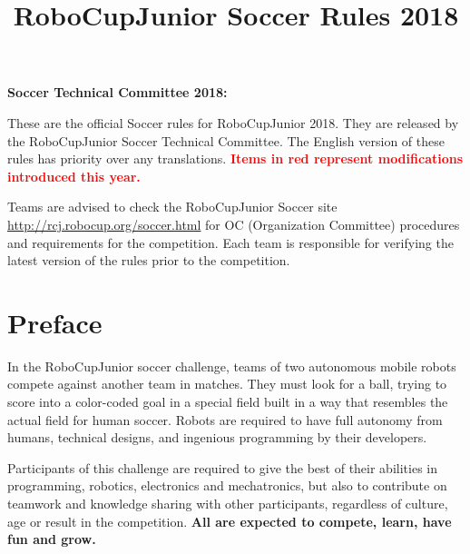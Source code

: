 \documentclass{article}
\title{\vspace{-5ex}RoboCupJunior Soccer Rules 2018\vspace{-5ex}}
\date{\vspace{-2ex}}
\begin{document}
\maketitle
\thispagestyle{firststyle}

\textbf{Soccer Technical Committee 2018:}


These are the official Soccer rules for RoboCupJunior 2018. They are released
by the RoboCupJunior Soccer Technical Committee. The English version of these
rules has priority over any translations. \textcolor{red}{\textbf{Items in red
represent modifications introduced this year.}}

Teams are advised to check the RoboCupJunior Soccer site
\href{http://rcj.robocup.org/soccer.html}{http://rcj.robocup.org/soccer.html}
for OC (Organization Committee) procedures and requirements for the
competition. Each team is responsible for verifying the latest version of the
rules prior to the competition.

\section*{Preface}

In the RoboCupJunior soccer challenge, teams of two autonomous mobile robots
compete against another team in matches. They must look for a ball, trying to
score into a color-coded goal in a special field built in a way that resembles
the actual field for human soccer. Robots are required to have full autonomy
from humans, technical designs, and ingenious programming by their developers.

Participants of this challenge are required to give the best of their abilities
in programming, robotics, electronics and mechatronics, but also to contribute
on teamwork and knowledge sharing with other participants, regardless of
culture, age or result in the competition. \textbf{All are expected to compete,
learn, have fun and grow.}
\end{document}
